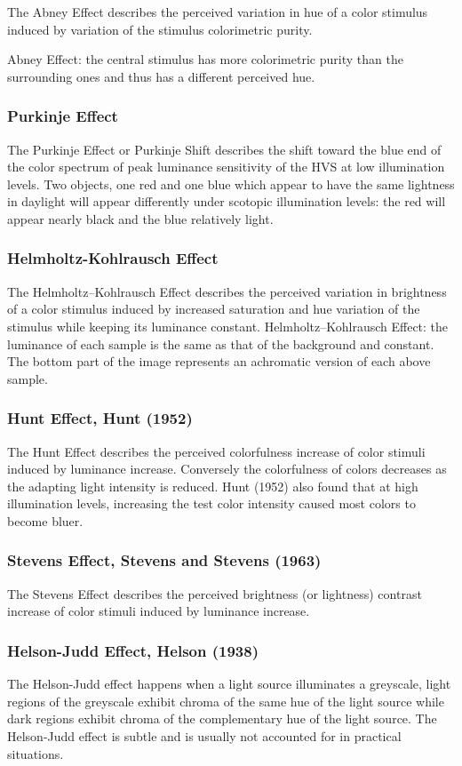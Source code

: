 The Abney Effect describes the perceived variation in hue of a color stimulus induced by variation of the stimulus colorimetric purity.

Abney Effect: the central stimulus has more colorimetric purity than the surrounding ones and thus has a different perceived hue.

\subsubsection{Purkinje Effect}

The Purkinje Effect or Purkinje Shift describes the shift toward the blue end of the color spectrum of peak luminance sensitivity of the HVS at low illumination levels.
Two objects, one red and one blue which appear to have the same lightness in daylight will appear differently under scotopic illumination levels: the red will appear nearly black and the blue relatively light.

\subsubsection{Helmholtz-Kohlrausch Effect}

The Helmholtz–Kohlrausch Effect describes the perceived variation in brightness of a color stimulus induced by increased saturation and hue variation of the stimulus while keeping its luminance constant.
Helmholtz–Kohlrausch Effect: the luminance of each sample is the same as that of the background and constant. The bottom part of the image represents an achromatic version of each above sample.

\subsubsection{Hunt Effect, Hunt (1952)}

The Hunt Effect describes the perceived colorfulness increase of color stimuli induced by luminance increase. Conversely the colorfulness of colors decreases as the adapting light intensity is reduced.
Hunt (1952) also found that at high illumination levels, increasing the test color intensity caused most colors to become bluer.

\subsubsection{Stevens Effect, Stevens and Stevens (1963)}

The Stevens Effect describes the perceived brightness (or lightness) contrast increase of color stimuli induced by luminance increase.

\subsubsection{Helson-Judd Effect, Helson (1938)}

The Helson-Judd effect happens when a light source illuminates a greyscale, light regions of the greyscale exhibit chroma of the same hue of the light source while dark regions exhibit chroma of the complementary hue of the light source. The Helson-Judd effect is subtle and is usually not accounted for in practical situations.

